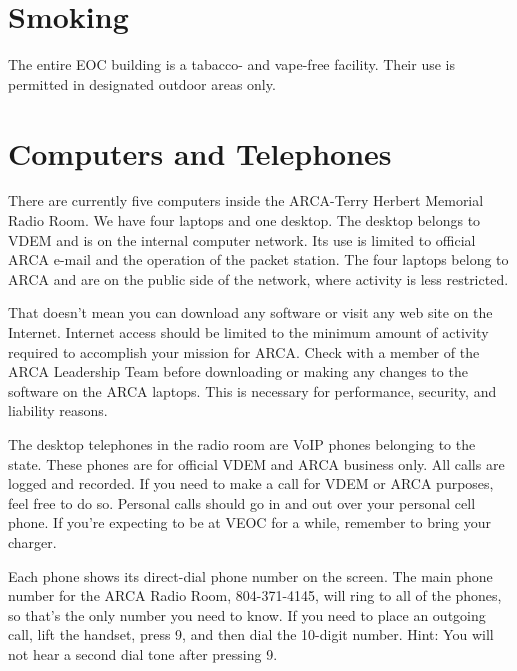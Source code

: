 \documentclass[pdflatex,letterpaper,twoside,12pt]{book}
\begin{document}
\section{Smoking}

The entire EOC building is a tabacco- and vape-free facility.  Their use is permitted in designated outdoor areas only.


\section{Computers and Telephones}

There are currently five computers inside the ARCA-Terry Herbert Memorial Radio Room.  We have four laptops and one desktop.  The desktop belongs to VDEM and is on the internal computer network.  Its use is limited to official ARCA e-mail and the operation of the packet station.  The four laptops belong to ARCA and are on the public side of the network, where activity is less restricted.

That doesn't mean you can download any software or visit any web site on the Internet.  Internet access should be limited to the minimum amount of activity required to accomplish your mission for ARCA.  Check with a member of the ARCA Leadership Team before downloading or making any changes to the software on the ARCA laptops.  This is necessary for performance, security, and liability reasons.

The desktop telephones in the radio room are VoIP phones belonging to the state.  These phones are for official VDEM and ARCA business only.  All calls are logged and recorded.  If you need to make a call for VDEM or ARCA purposes, feel free to do so.  Personal calls should go in and out over your personal cell phone.  If you're expecting to be at VEOC for a while, remember to bring your charger.

Each phone shows its direct-dial phone number on the screen.  The main phone number for the ARCA Radio Room, 804-371-4145, will ring to all of the phones, so that's the only number you need to know.  If you need to place an outgoing call, lift the handset, press 9, and then dial the 10-digit number.  Hint: You will not hear a second dial tone after pressing 9.

\end{document}
